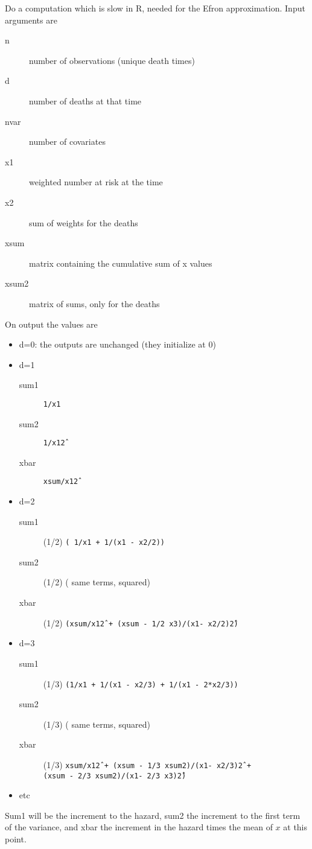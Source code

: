 \documentclass{article}
\newcommand{\code}[1]{\texttt{#1}}
\begin{document}
Do a computation which is slow in R, needed for the Efron approximation.
Input arguments are \begin{description}
  \item[n] number of observations (unique death times)
  \item[d] number of deaths at that time
  \item[nvar] number of covariates
  \item[x1] weighted number at risk at the time
  \item[x2] sum of weights for the deaths
  \item[xsum] matrix containing the cumulative sum of x values
  \item[xsum2] matrix of sums, only for the deaths
\end{description}
On output the values are 
\begin{itemize}
  \item d=0: the outputs are unchanged (they initialize at 0)
  \item d=1
    \begin{description}
      \item[sum1]  \code{1/x1}
      \item[sum2]  \code{1/x1\^2}
      \item[xbar]  \code{xsum/x1\^2}
    \end{description}
    \item d=2
      \begin{description}
        \item[sum1] (1/2) \code{( 1/x1 + 1/(x1 - x2/2))}
        \item[sum2] (1/2) (  same terms, squared)
        \item[xbar] (1/2) \code{(xsum/x1\^2 + (xsum - 1/2 x3)/(x1- x2/2)\^2)}
    \end{description}
    \item d=3
      \begin{description}
        \item[sum1] (1/3) \code{(1/x1 + 1/(x1 - x2/3) + 1/(x1 - 2*x2/3))}
        \item[sum2] (1/3) (  same terms, squared)
        \item[xbar] (1/3) \code{xsum/x1\^2 + (xsum - 1/3 xsum2)/(x1- x2/3)\^2 +} 
          \\
          \code{(xsum - 2/3 xsum2)/(x1- 2/3 x3)\^2)}
      \end{description}
    \item etc
\end{itemize}
Sum1 will be the increment to the hazard, sum2 the increment to the 
first term of the variance, and xbar the increment in the hazard times
the mean of $x$ at this point.
\end{document}

